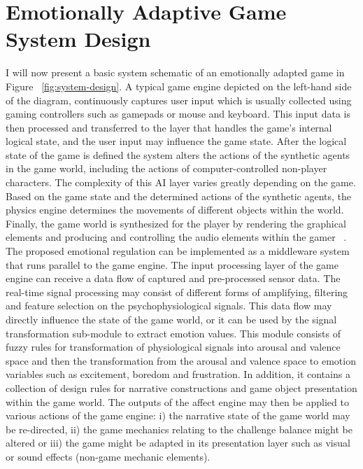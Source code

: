 \section{Emotionally Adaptive Game System Design}

I will now present a basic system schematic of an emotionally adapted game in Figure ~\ref{fig:system-design}. A typical game engine depicted on the left-hand side of the diagram, continuously captures user input which is usually collected using gaming controllers such as gamepads or mouse and keyboard. %
This input data is then processed and transferred to the layer that handles the game's internal logical state, and the user input may influence the game state. After the logical state of the game is defined the system alters the actions of the synthetic agents in the game world, including the actions of computer-controlled non-player characters. The complexity of this AI layer varies greatly depending on the game. Based on the game state and the determined actions of the synthetic agents, the physics engine determines the movements of different objects within the world. Finally, the game world is synthesized for the player by rendering the graphical elements and producing and controlling the audio elements within the gamer ~\cite{saari2005emotional}. The proposed emotional regulation can be implemented as a middleware system that runs parallel to the game engine. The input processing layer of the game engine can receive a data flow of captured and pre-processed sensor data. The real-time signal processing may consist of different forms of amplifying, filtering and feature selection on the psychophysiological signals. This data flow may directly influence the state of the game world, or it can be used by the signal transformation sub-module to extract emotion values. This module consists of fuzzy rules for transformation of physiological signals into arousal and valence space and then the transformation from the arousal and valence space to emotion variables such as excitement, boredom and frustration. In addition, it contains a collection of design rules for narrative constructions and game object presentation within the game world. The outputs of the affect engine may then be applied to various actions of the game engine: i) the narrative state of the game world may be re-directed, ii) the game mechanics relating to the challenge balance might be altered or iii) the game might be adapted in its presentation layer such as visual or sound effects (non-game mechanic elements).

